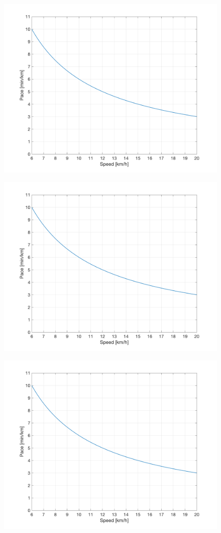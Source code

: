 \begin{figure}[H]
  \begin{minipage}[b]{.5\linewidth}
    \centering
	\includegraphics[width=0.8\linewidth]{Figures/PacevsSpeed.png}
	\label{fig:1a}
  \end{minipage}%
  \begin{minipage}[b]{.5\linewidth}
    \centering
	\includegraphics[width=0.8\linewidth]{Figures/PacevsSpeed.png}
	\label{fig:1b}
  \end{minipage}
  \label{fig:1}
  \begin{minipage}[b]{.5\linewidth}
    \centering
	\includegraphics[width=0.8\linewidth]{Figures/PacevsSpeed.png}

\end{minipage}
\end{figure}
